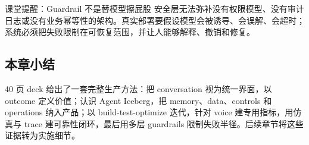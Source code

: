 \begin{warningbox}{课堂提醒：Guardrail 不是替模型擦屁股}
安全层无法弥补没有权限模型、没有审计日志或没有业务幂等性的架构。真实部署要假设模型会被诱导、会误解、会超时；系统必须把失败限制在可恢复范围，并让人能够解释、撤销和修复。
\end{warningbox}

\subsection{本章小结}
40 页 deck 给出了一套完整生产方法：把 conversation 视为统一界面，以 outcome 定义价值；认识 Agent Iceberg，把 memory、data、controls 和 operations 纳入产品；以 build-test-optimize 迭代，针对 voice 建专用指标，用仿真与 trace 建可靠性闭环，最后用多层 guardrails 限制失败半径。后续章节将这些证据转为实施细节。

